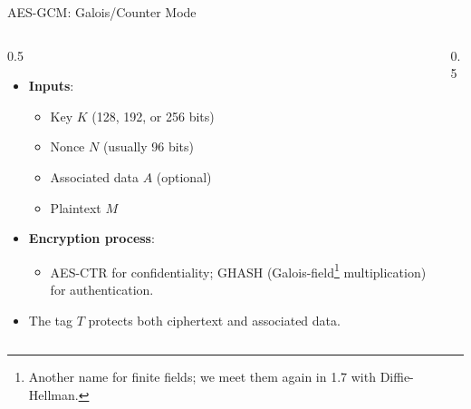 \ifdefined\PRESENTATION\else\PassOptionsToClass{handout}{beamer}\fi\documentclass[aspectratio=169, lualatex]{beamer}
\begin{document}
\begin{frame}{AES-GCM: Galois/Counter Mode}
	\begin{columns}[c]
		\begin{column}{0.5\textwidth}
			\begin{itemize}
				\item \textbf{Inputs}:
				      \begin{itemize}
					      \item Key $K$ (128, 192, or 256 bits)
					      \item Nonce $N$ (usually 96 bits)
					      \item Associated data $A$ (optional)
					      \item Plaintext $M$
				      \end{itemize}
				\item \textbf{Encryption process}:
				      \begin{itemize}
					      \item AES-CTR for confidentiality; GHASH (Galois-field\footnote{Another name for finite fields; we meet them again in 1.7 with Diffie-Hellman.} multiplication) for authentication.
				      \end{itemize}
				\item The tag $T$ protects both ciphertext and associated data.
			\end{itemize}
		\end{column}
		\begin{column}{0.5\textwidth}
		\end{column}
	\end{columns}
\end{frame}
\end{document}
